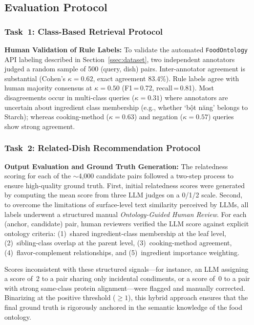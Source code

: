 \subsection{Evaluation Protocol}
\label{ssec:eval_protocol}

\subsubsection{Task~1: Class-Based Retrieval Protocol}
\label{sssec:eval_task1}

\hfill\break\indent\textbf{Human Validation of Rule Labels:}
To validate the automated \texttt{FoodOntology} API labeling described in Section~\ref{ssec:dataset}, two independent annotators judged a random sample of 500 (query, dish) pairs. Inter-annotator agreement is substantial (Cohen's $\kappa = 0.62$, exact agreement 83.4\%). Rule labels agree with human majority consensus at $\kappa = 0.50$ (F1\,=\,0.72, recall\,=\,0.81). Most disagreements occur in multi-class queries ($\kappa = 0.31$) where annotators are uncertain about ingredient class membership (e.g., whether `bột năng' belongs to Starch); whereas cooking-method ($\kappa = 0.63$) and negation ($\kappa = 0.57$) queries show strong agreement.

\subsubsection{Task~2: Related-Dish Recommendation Protocol}
\label{sssec:eval_task2}

\hfill\break\indent\textbf{Output Evaluation and Ground Truth Generation:} 
The relatedness scoring for each of the ${\sim}$4{,}000 candidate pairs followed a two-step process to ensure high-quality ground truth. First, initial relatedness scores were generated by computing the mean score from three LLM judges on a 0/1/2 scale. Second, to overcome the limitations of surface-level text similarity perceived by LLMs, all labels underwent a structured manual \textit{Ontology-Guided Human Review}. For each (anchor, candidate) pair, human reviewers verified the LLM score against explicit ontology criteria: (1)~shared ingredient-class membership at the leaf level, (2)~sibling-class overlap at the parent level, (3)~cooking-method agreement, (4)~flavor-complement relationships, and (5)~ingredient importance weighting. 

Scores inconsistent with these structured signals---for instance, an LLM assigning a score of~2 to a pair sharing only incidental condiments, or a score of~0 to a pair with strong same-class protein alignment---were flagged and manually corrected. Binarizing at the positive threshold ($\geq 1$), this hybrid approach ensures that the final ground truth is rigorously anchored in the semantic knowledge of the food ontology.


